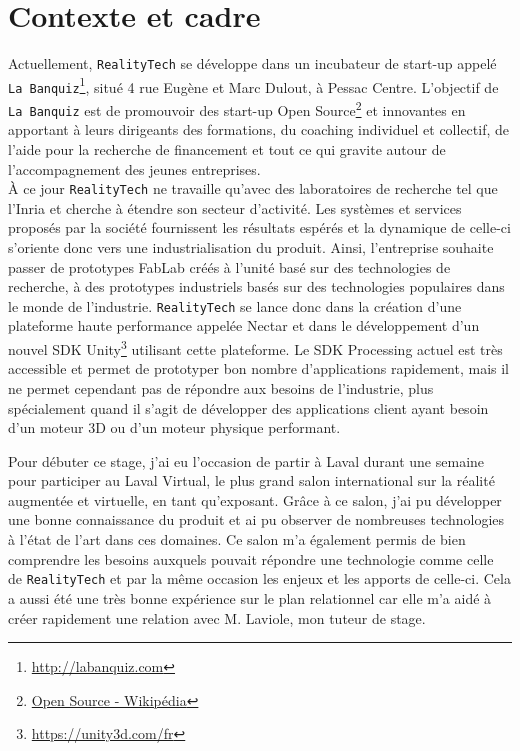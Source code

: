 \section{Contexte et cadre}
\label{sec:contexte}
Actuellement, \texttt{RealityTech} se développe dans un incubateur de start-up appelé \texttt{La Banquiz}\footnote{\href{http://labanquiz.com}{http://labanquiz.com}}, situé 4 rue Eugène et Marc Dulout, à Pessac Centre. L'objectif de \texttt{La Banquiz} est de promouvoir des start-up Open Source\footnote{\href{https://fr.wikipedia.org/wiki/Open\_source}{Open Source - Wikipédia}} et innovantes en apportant à leurs dirigeants des formations, du coaching individuel et collectif, de l'aide pour la recherche de financement et tout ce qui gravite autour de l'accompagnement des jeunes entreprises.\\

À ce jour \texttt{RealityTech} ne travaille qu'avec des laboratoires de recherche tel que l'Inria et cherche à étendre son secteur d'activité. Les systèmes et services proposés par la société fournissent les résultats espérés et la dynamique de celle-ci s'oriente donc vers une industrialisation du produit. Ainsi, l'entreprise souhaite passer de prototypes FabLab créés à l'unité basé sur des technologies de recherche, à des prototypes industriels basés sur des technologies populaires dans le monde de l'industrie. \texttt{RealityTech} se lance donc dans la création d'une plateforme haute performance appelée Nectar et dans le développement d'un nouvel SDK Unity\footnote{\href{https://unity3d.com/fr}{https://unity3d.com/fr}} utilisant cette plateforme. Le SDK Processing actuel est très accessible et permet de prototyper bon nombre d'applications rapidement, mais il ne permet cependant pas de répondre aux besoins de l'industrie, plus spécialement quand il s'agit de développer des applications client ayant besoin d'un moteur 3D ou d'un moteur physique performant.

Pour débuter ce stage, j'ai eu l'occasion de partir à Laval durant une semaine pour participer au Laval Virtual, le plus grand salon international sur la réalité augmentée et virtuelle, en tant qu'exposant. Grâce à ce salon, j'ai pu développer une bonne connaissance du produit et ai pu observer de nombreuses technologies à l'état de l'art dans ces domaines. Ce salon m'a également permis de bien comprendre les besoins auxquels pouvait répondre une technologie comme celle de \texttt{RealityTech} et par la même occasion les enjeux et les apports de celle-ci. Cela a aussi été une très bonne expérience sur le plan relationnel car elle m'a aidé à créer rapidement une relation avec M. Laviole, mon tuteur de stage.

